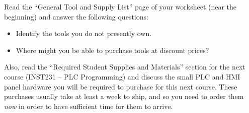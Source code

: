 

Read the ``General Tool and Supply List'' page of your worksheet (near the beginning) and answer the following questions:

\vskip 10pt

\begin{itemize}
\item{} Identify the tools you do not presently own.
\vskip 10pt
\item{} Where might you be able to purchase tools at discount prices?
\vskip 10pt
\end{itemize}

\vskip 10pt

Also, read the ``Required Student Supplies and Materials'' section for the next course (INST231 -- PLC Programming) and discuss the small PLC and HMI panel hardware you will be required to purchase for this next course.  These purchases usually take at least a week to ship, and so you need to order them {\it now} in order to have sufficient time for them to arrive.


















